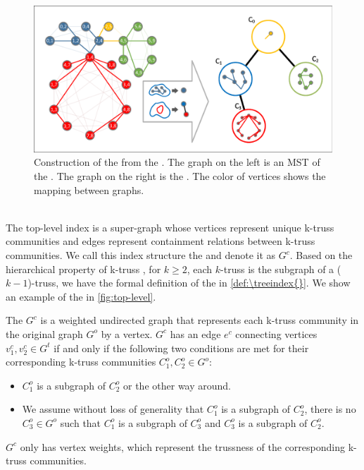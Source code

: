 \begin{figure}[h]
    \centering
    \includegraphics[width=0.8\linewidth, trim={0.6cm 0.6cm, 0.6cm, 0.6cm}, clip]{./figures/top_level.pdf}
		\vspace{-0.2cm}
    \caption{Construction of the \treeindex{} from the \inducedgraph{}. The graph on the left is an MST of the \inducedgraph{}. The graph on the right is the \treeindex{}. The color of vertices shows the mapping between graphs.}
    \label{fig:top-level}
		\vspace{-0.1cm}
\end{figure}

~\\The top-level index is a super-graph whose vertices represent unique k-truss communities and edges represent containment relations between k-truss communities. We call this index structure the \treeindex{} and denote it as $G^c$. Based on the hierarchical property of k-truss \cite{cohen2008trusses}, \ie for $k \ge 2$, each $k$-truss is the subgraph of a ($k-1$)-truss, we have the formal definition of the \treeindex{} in \autoref{def:\treeindex{}}. We show an example of the \treeindex{} in \autoref{fig:top-level}.

\begin{Def}[\Treeindex{}]
The \treeindex{} $G^c$ is a weighted undirected graph that represents each k-truss community in the original graph $G^o$ by a vertex. $G^c$ has an edge $e^c$ connecting vertices $v^{c}_{1}, v^{c}_{2} \in G^{t}$ if and only if the following two conditions are met for their corresponding k-truss communities $C^{o}_{1}, C^{o}_{2} \in G^{o}$:
\begin{itemize}
	\item $C^{o}_{1}$ is a subgraph of $C^{o}_{2}$ or the other way around.
	\item We assume without loss of generality that $C^{o}_{1}$ is a subgraph of $C^{o}_{2}$, there is no $C^{o}_{3} \in G^{o}$ such that $C^{o}_{1}$ is a subgraph of $C^{o}_{3}$ and $C^{o}_{3}$ is a subgraph of $C^{o}_{2}$.
\end{itemize}
$G^c$ only has vertex weights, which represent the trussness of the corresponding k-truss communities.
\label{def:\treeindex{}}
\end{Def}

